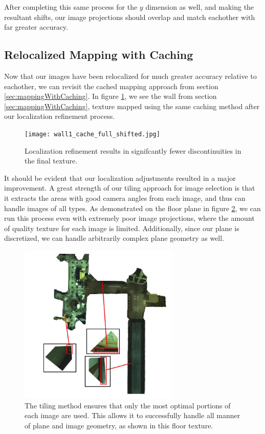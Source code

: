 \documentclass[10pt,twocolumn,letterpaper]{article}
\begin{document}
After completing this same process for the $y$ dimension as well, and
making the resultant shifts, our image projections should overlap and
match eachother with far greater accuracy.

\subsection{Relocalized Mapping with Caching}
\label{sec:mappingCachingLocalized}
Now that our images have been relocalized for much greater accuracy
relative to eachother, we can revisit the cached mapping approach from
section \ref{sec:mappingWithCaching}.  In figure \ref{fig:shifted}, we
see the wall from section \ref{sec:mappingWithCaching}, texture mapped
using the same caching method after our localization refinement
process.

\begin{figure}
  \centering
  \texttt{[image: wall1\_cache\_full\_shifted.jpg]}
  \caption{Localization refinement results in signifcantly fewer
    discontinuities in the final texture.}
  \label{fig:shifted}
\end{figure}


It should be evident that our localization adjustments resulted in a
major improvement. A great strength of our tiling approach for image
selection is that it extracts the areas with good camera angles from
each image, and thus can handle images of all types. As demonstrated
on the floor plane in figure \ref{fig:floor_suboptimal}, we can run
this process even with extremely poor image projections, where the
amount of quality texture for each image is limited. Additionally,
since our plane is discretized, we can handle arbitrarily complex
plane geometry as well.

\begin{figure}
  \centering
  \includegraphics[width=3in]{floor_suboptimal.jpg}
  \caption{The tiling method ensures that only the most optimal
    portions of each image are used. This allows it to successfully
    handle all manner of plane and image geometry, as shown in this
    floor texture.}
  \label{fig:floor_suboptimal}
\end{figure}
\end{document}
